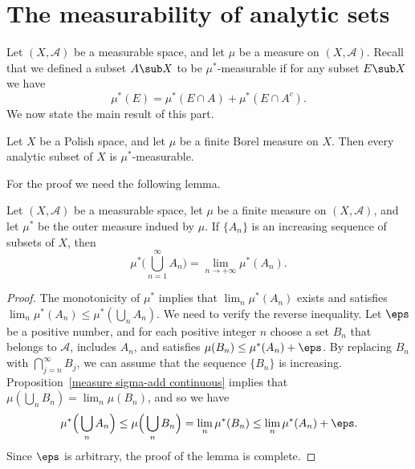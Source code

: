 \section{The measurability of analytic sets}
Let $(X,\mathcal{A})$ be a measurable space, and let $\mu$ be a measure on $(X,\mathcal{A})$. Recall that we defined a subset $A\sub X$ to be $\mu^*$-measurable if for any subset $E\sub X$ we have
\[\mu^*(E)=\mu^*(E\cap A)+\mu^*(E\cap A^c).\]
We now state the main result of this part.
\begin{theorem}\label{analytic is measurable}
Let $X$ be a Polish space, and let $\mu$ be a finite Borel measure on $X$. Then every analytic subset of $X$ is $\mu^*$-measurable.
\end{theorem}
For the proof we need the following lemma.
\begin{lemma}\label{outer measure continuous from below}
Let $(X,\mathcal{A})$ be a measurable space, let $\mu$ be a finite measure on $(X,\mathcal{A})$, and let $\mu^*$ be the outer measure indued by $\mu$. If $\{A_n\}$ is an increasing sequence of subsets of $X$, then
\[\mu^*\Big(\bigcup_{n=1}^{\infty}A_n\Big)=\lim_{n\to+\infty}\mu^*(A_n).\]
\end{lemma}
\begin{proof}
The monotonicity of $\mu^*$ implies that $\lim_n\mu^*(A_n)$ exists and satisfies $\lim_n\mu^*(A_n)\leq\mu^*(\bigcup_nA_n)$. We need to verify the reverse inequality. Let $\eps$ be a positive number, and for each positive integer $n$ choose a set $B_n$ that belongs to $\mathcal{A}$, includes $A_n$, and satisfies $\mu(B_n)\leq\mu^*(A_n)+\eps$. By replacing $B_n$ with $\bigcap_{j=n}^{\infty}B_j$, we can assume that the sequence $\{B_n\}$ is increasing. Proposition~\ref{measure sigma-add continuous} implies that $\mu(\bigcup_nB_n)=\lim_n\mu(B_n)$, and so we have
\[\mu^*\Big(\bigcup_nA_n\Big)\leq\mu\Big(\bigcup_nB_n\Big)=\lim_n\mu^*(B_n)\leq\lim_n\mu^*(A_n)+\eps.\]
Since $\eps$ is arbitrary, the proof of the lemma is complete.
\end{proof}
